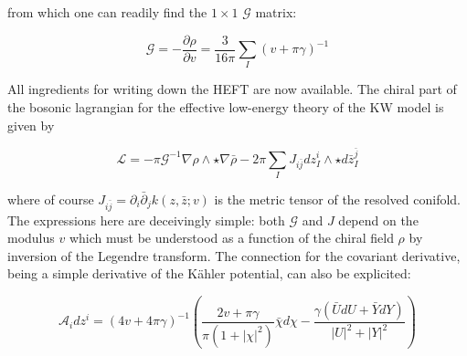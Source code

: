 from which one can readily find the $1\times1$ $\mathcal{G}$ matrix:

\begin{equation}
	\mathcal{G} = - \frac{\partial \rho}{\partial v} = \frac{3}{16\pi}\sum_I (v+\pi\gamma)^{-1}
	\label{}
\end{equation}

All ingredients for writing down the HEFT are now available. The chiral part of the bosonic lagrangian for the effective low-energy theory of the KW model is given by

\begin{equation}
	\mathcal{L} = - \pi \mathcal{G}^{-1} \nabla \rho \wedge \star \nabla \bar \rho - 2\pi \sum_I J_{i\bar j} dz_I^i \wedge \star d\bar z_I^{\bar j} 
	\label{}
\end{equation}

where of course $J_{i\bar j} = \partial_i \bar \partial_j k(z,\bar z; v)$ is the metric tensor of the resolved conifold. The expressions here are deceivingly simple: both $\mathcal{G}$ and $J$ depend on the modulus $v$ which must be understood as a function of the chiral field $\rho$ by inversion of the Legendre transform. The connection for the covariant derivative, being a simple derivative of the K\"ahler potential, can also be explicited:

\begin{equation}
	\mathcal{A}_i dz^i = (4v + 4\pi \gamma)^{-1} \left( \frac{2v + \pi\gamma}{\pi(1+|\chi|^2)}\bar\chi d\chi - \frac{\gamma\left( \bar U dU + \bar Y dY \right)}{|U|^2 + |Y|^2} \right)
	\label{}
\end{equation}
